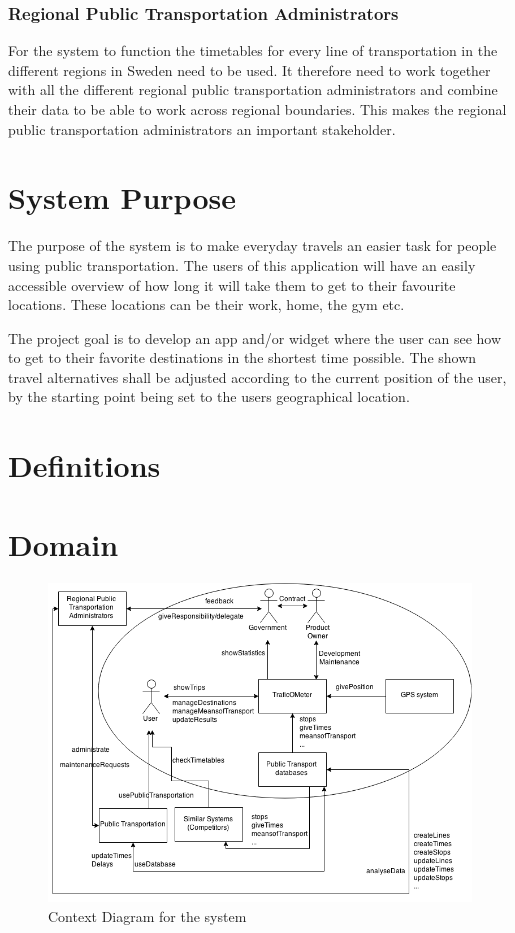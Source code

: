 \documentclass[a4paper]{article}
\begin{document}
			\subsubsection{Regional Public Transportation Administrators}
			For the system to function the timetables for every line of transportation in the different regions in Sweden need to be used. It therefore need to work together with all the different regional public transportation administrators and combine their data to be able to work across regional boundaries. This makes the regional public transportation administrators an important stakeholder.
	
	\section{System Purpose} %
	The purpose of the system is to make everyday travels an easier task for people using public transportation. The users of this application will have an easily accessible overview of how long it will take them to get to their favourite locations. These locations can be their work, home, the gym etc.
	
	
The project goal is to develop an app and/or widget where the user can see how to get to their favorite destinations in the shortest time possible. The shown travel alternatives shall be adjusted according to the current position of the user, by the starting point being set to the users geographical location.
	\section{Definitions}
		
	\section{Domain}
		\begin{figure}[h]
				\includegraphics[scale=0.50]{img/Context-v3.png}
			\caption{Context Diagram for the system}
		\end{figure}
\end{document}
